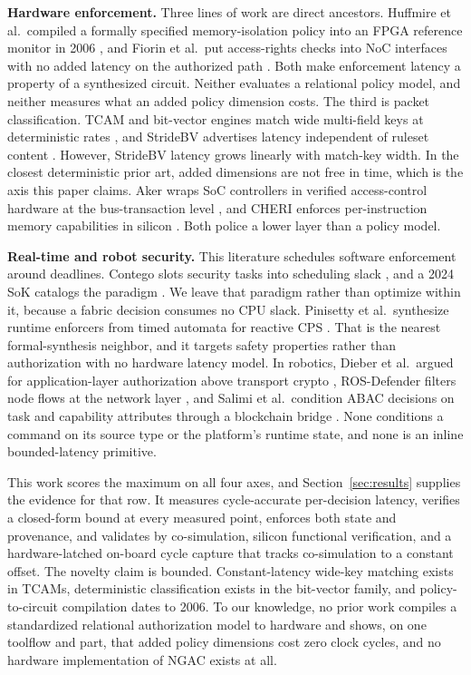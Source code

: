 \documentclass[conference]{IEEEtran}
\newcommand{\new}[1]{\textcolor{hkred}{#1}}
\begin{document}
\textbf{Hardware enforcement.} Three lines of work are direct ancestors. Huffmire et al.\ compiled a formally specified memory-isolation policy into an FPGA reference monitor in 2006 \cite{huffmire2006policy}, and Fiorin et al.\ put access-rights checks into NoC interfaces with no added latency on the authorized path \cite{fiorin2008secure}. Both make enforcement latency a property of a synthesized circuit. Neither evaluates a relational policy model, and neither measures what an added policy dimension costs. The third is packet classification. TCAM and bit-vector engines match wide multi-field keys at deterministic rates \cite{song2005bvtcam}, and StrideBV advertises latency independent of ruleset content \cite{ganegedara2014scalable}. However, StrideBV latency grows linearly with match-key width. In the closest deterministic prior art, added dimensions are not free in time, which is the axis this paper claims. Aker wraps SoC controllers in verified access-control hardware at the bus-transaction level \cite{restuccia2021aker}, and CHERI enforces per-instruction memory capabilities in silicon \cite{watson2015cheri}. Both police a lower layer than a policy model.

\textbf{Real-time and robot security.} This literature schedules software enforcement around deadlines. Contego slots security tasks into scheduling slack \cite{hasan2017contego}, and a 2024 SoK catalogs the paradigm \cite{hasan2024sok}. We leave that paradigm rather than optimize within it, because a fabric decision consumes no CPU slack. Pinisetty et al.\ synthesize runtime enforcers from timed automata for reactive CPS \cite{pinisetty2017runtime}. That is the nearest formal-synthesis neighbor, and it targets safety properties rather than authorization with no hardware latency model. In robotics, Dieber et al.\ argued for application-layer authorization above transport crypto \cite{dieber2017security}, ROS-Defender filters node flows at the network layer \cite{rivera2019rosdefender}, and Salimi et al.\ condition ABAC decisions on task and capability attributes through a blockchain bridge \cite{salimi2025abac}. None conditions a command on its source type or the platform's runtime state, and none is an inline bounded-latency primitive.

This work scores the maximum on all four axes, and Section~\ref{sec:results} supplies the evidence for that row. It measures cycle-accurate per-decision latency, verifies a closed-form bound at every measured point, enforces both state and provenance, and validates by co-simulation, silicon functional verification\new{, and a hardware-latched on-board cycle capture that tracks co-simulation to a constant offset}. The novelty claim is bounded. Constant-latency wide-key matching exists in TCAMs, deterministic classification exists in the bit-vector family, and policy-to-circuit compilation dates to 2006. To our knowledge, no prior work compiles a standardized relational authorization model to hardware and shows, on one toolflow and part, that added policy dimensions cost zero clock cycles, and no hardware implementation of NGAC exists at all.
\end{document}
